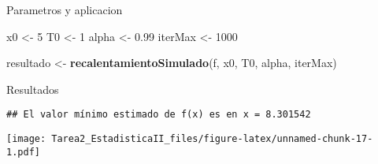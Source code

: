 \documentclass[
]{article}
\newenvironment{Shaded}{\begin{snugshade}}{\end{snugshade}}
\newcommand{\AttributeTok}[1]{\textcolor[rgb]{0.13,0.29,0.53}{#1}}
\newcommand{\CommentTok}[1]{\textcolor[rgb]{0.56,0.35,0.01}{\textit{#1}}}
\newcommand{\DecValTok}[1]{\textcolor[rgb]{0.00,0.00,0.81}{#1}}
\newcommand{\FloatTok}[1]{\textcolor[rgb]{0.00,0.00,0.81}{#1}}
\newcommand{\FunctionTok}[1]{\textcolor[rgb]{0.13,0.29,0.53}{\textbf{#1}}}
\newcommand{\NormalTok}[1]{#1}
\newcommand{\OtherTok}[1]{\textcolor[rgb]{0.56,0.35,0.01}{#1}}
\newcommand{\SpecialCharTok}[1]{\textcolor[rgb]{0.81,0.36,0.00}{\textbf{#1}}}
\newcommand{\StringTok}[1]{\textcolor[rgb]{0.31,0.60,0.02}{#1}}
\begin{document}
Parametros y aplicacion

\begin{Shaded}
\begin{Highlighting}[]
\NormalTok{x0 }\OtherTok{\textless{}{-}} \DecValTok{5}
\NormalTok{T0 }\OtherTok{\textless{}{-}} \DecValTok{1}
\NormalTok{alpha }\OtherTok{\textless{}{-}} \FloatTok{0.99}
\NormalTok{iterMax }\OtherTok{\textless{}{-}} \DecValTok{1000}

\NormalTok{resultado }\OtherTok{\textless{}{-}} \FunctionTok{recalentamientoSimulado}\NormalTok{(f, x0, T0, alpha, iterMax)}
\end{Highlighting}
\end{Shaded}

Resultados

\begin{Shaded}
\end{Shaded}

\begin{verbatim}
## El valor mínimo estimado de f(x) es en x = 8.301542
\end{verbatim}

\begin{Shaded}
\end{Shaded}

\texttt{[image: Tarea2\_EstadisticaII\_files/figure-latex/unnamed-chunk-17-1.pdf]}
\end{document}
